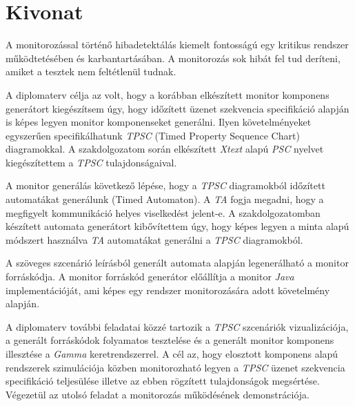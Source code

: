 \setcounter{page}{1}

\selecthungarian

\chapter*{Kivonat}

A monitorozással történő hibadetektálás kiemelt fontosságú egy kritikus rendszer működtetésében és karbantartásában.
A monitorozás sok hibát fel tud deríteni, amiket a tesztek nem feltétlenül tudnak.

A diplomaterv célja az volt, hogy a korábban elkészített monitor komponens generátort kiegészítsem úgy, hogy időzített üzenet szekvencia specifikáció alapján is képes legyen monitor komponenseket generálni.
Ilyen követelményeket egyszerűen specifikálhatunk \textit{TPSC} (Timed Property Sequence Chart) diagramokkal.
A szakdolgozatom során elkészített \textit{Xtext} alapú \textit{PSC} nyelvet kiegészítettem a \textit{TPSC} tulajdonságaival.

A monitor generálás következő lépése, hogy a \textit{TPSC} diagramokból időzített automatákat generálunk (Timed Automaton).
A \textit{TA} fogja megadni, hogy a megfigyelt kommunikáció helyes viselkedést jelent-e.
A szakdolgozatomban készített automata generátort kibővítettem úgy, hogy képes legyen a minta alapú módszert használva \textit{TA} automatákat generálni a \textit{TPSC} diagramokból.

A szöveges szcenárió leírásból generált automata alapján legenerálható a monitor forráskódja.
A monitor forráskód generátor előállítja a monitor \textit{Java} implementációját, ami képes egy rendszer monitorozására adott követelmény alapján.

A diplomaterv további feladatai közzé tartozik a \textit{TPSC} szcenáriók vizualizációja, a generált forráskódok folyamatos tesztelése és a generált monitor komponens illesztése a \textit{Gamma} keretrendszerrel.
A cél az, hogy elosztott komponens alapú rendszerek szimulációja közben monitorozható legyen a \textit{TPSC} üzenet szekvencia specifikáció teljesülése illetve az ebben rögzített tulajdonságok megsértése.
Végezetül az utolsó feladat a monitorozás működésének demonstrációja.

\vfill
\selectenglish


